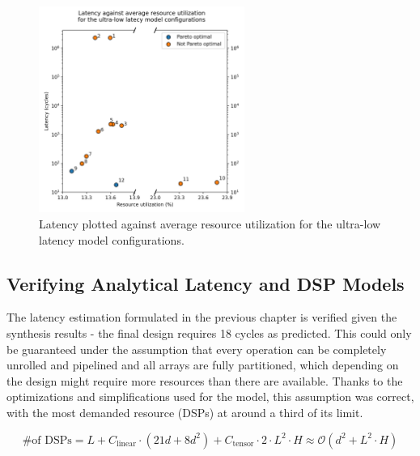 \begin{figure}[hpt!]
  \centering
  \includegraphics[trim={0cm 0cm 0cm 0cm}, clip, width=0.6\textwidth, center]{../logs/hardware_optimizations_pareto.png}
  \caption{Latency plotted against average resource utilization for the ultra-low latency model configurations.}
  \label{fig:hardware-optimizations-pareto}
\end{figure}

\subsection{Verifying Analytical Latency and DSP Models}

The latency estimation formulated in the previous chapter is verified given the synthesis results - the final design requires 18 cycles as predicted. This could only be guaranteed under the assumption that every operation can be completely unrolled and pipelined and all arrays are fully partitioned, which depending on the design might require more resources than there are available. Thanks to the optimizations and simplifications used for the model, this assumption was correct, with the most demanded resource (DSPs) at around a third of its limit.

\begin{equation} \label{eq:dsp-model-new}
  \text{\# of DSPs} = L + C_{\text{linear}} \cdot (21d + 8d^2) + C_{\text{tensor}} \cdot 2 \cdot L^2 \cdot H \approx \mathcal{O}(d^2 + L^2 \cdot H)
\end{equation}

